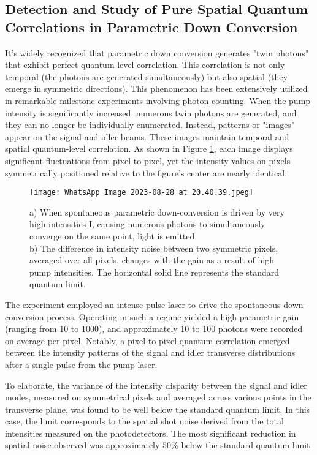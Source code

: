 \documentclass{article}
\begin{document}
\subsection{Detection and Study of Pure Spatial Quantum Correlations in Parametric
Down Conversion}
It's widely recognized that parametric down conversion generates "twin photons" \cite{neves2005generation} that exhibit perfect quantum-level correlation. This correlation is not only temporal (the photons are generated simultaneously) but also spatial (they emerge in symmetric directions). This phenomenon has been extensively utilized in remarkable milestone experiments involving photon counting. When the pump intensity is significantly increased, numerous twin photons are generated, and they can no longer be individually enumerated. Instead, patterns or "images" appear on the signal and idler beams. These images maintain temporal and spatial quantum-level correlation. As shown in Figure \ref{fig:2}, each image displays significant fluctuations from pixel to pixel, yet the intensity values on pixels symmetrically positioned relative to the figure's center are nearly identical.
\begin{figure}
    \centering
    \texttt{[image: WhatsApp Image 2023-08-28 at 20.40.39.jpeg]}
    \caption{a) When spontaneous parametric down-conversion is driven by very high intensities I, causing numerous photons to simultaneously converge on the same point, light is emitted.\\
b) The difference in intensity noise between two symmetric pixels, averaged over all pixels, changes with the gain as a result of high pump intensities. The horizontal solid line represents the standard quantum limit.}
    \label{fig:2}
\end{figure}

The experiment \cite{PhysRevLett.93.243601} employed an intense pulse laser to drive the spontaneous down-conversion process. Operating in such a regime yielded a high parametric gain (ranging from 10 to 1000), and approximately 10 to 100 photons were recorded on average per pixel. Notably, a pixel-to-pixel quantum correlation emerged between the intensity patterns of the signal and idler transverse distributions after a single pulse from the pump laser.

To elaborate, the variance of the intensity disparity between the signal and idler modes, measured on symmetrical pixels and averaged across various points in the transverse plane, was found to be well below the standard quantum limit. In this case, the limit corresponds to the spatial shot noise derived from the total intensities measured on the photodetectors. The most significant reduction in spatial noise observed was approximately $50\%$ below the standard quantum limit.
\end{document}
